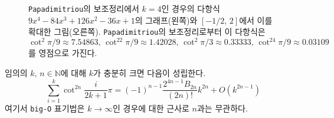 \begin{figure}[!ht]
{
    }
    \caption{\texttt{Papadimitriou}의 보조정리에서 $k=4$인 경우의 다항식 $9x^4-84x^3+126x^2-36x+1$의 그래프(왼쪽)와 $[-1/2,\,2]$에서 이를 확대한 그림(오른쪽). \texttt{Papadimitriou}의 보조정리로부터 이 다항식은 $\cot^2\pi/9\approx7.54863,\,\cot^22\pi/9\approx1.42028,\,\cot^2\pi/3\approx0.33333,\,\cot^24\pi/9\approx0.03109$를 영점으로 가진다.}
\end{figure}

\begin{lemma}
    임의의 $k,\,n\in\mathbb{N}$에 대해 $k$가 충분히 크면 다음이 성립한다.
    \begin{equation*}
        \sum_{i=1}^k\cot^{2n}\frac{i}{2k+1}\pi=(-1)^{n-1}\frac{2^{4n-1}B_{2n}}{(2n)!}k^{2n}+O(k^{2n-1})
    \end{equation*}
    여기서 \texttt{big-O} 표기법은 $k\to\infty$인 경우에 대한 근사로 $n$과는 무관하다.
\end{lemma}

